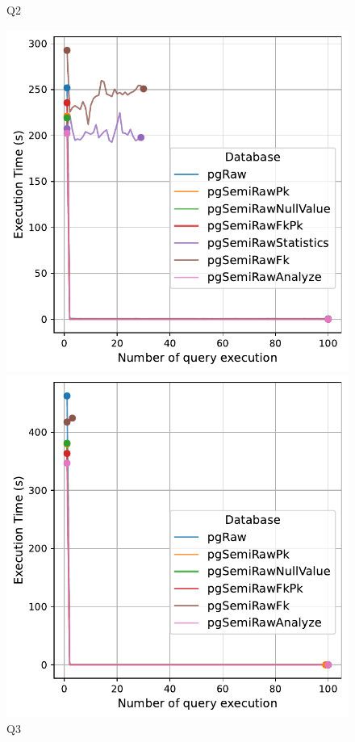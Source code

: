 \begin{figure}[h!]
\begin{minipage}[b]{0.45\linewidth}
    \caption*{Q2}
\end{minipage}
\vspace{0.5cm}
\begin{minipage}[b]{0.45\linewidth}
    \centering
    \includegraphics[width=1.0\linewidth]{charts-eval-exp-time/execution_time_db_type_Q3.pdf}
    \caption*{Q3}
\end{minipage}
\hfill
\begin{minipage}[b]{0.45\linewidth}
    \centering
    \includegraphics[width=1.0\linewidth]{charts-eval-exp-time/execution_time_db_type_Q4.pdf}

\end{minipage}
\end{figure}
